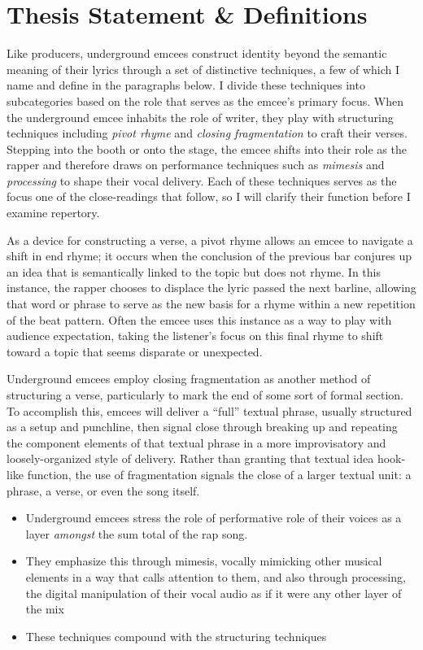 \onehalfspacing

\section{Thesis Statement \& Definitions}
Like producers, underground emcees construct identity beyond the semantic meaning of their lyrics
through a set of distinctive techniques, a few of which I name and define in the paragraphs below. 
I divide these techniques into subcategories based on the role that serves as the emcee's primary 
focus. When the underground emcee inhabits the role of writer, they play with structuring techniques 
including  \emph{pivot rhyme} and \emph{closing fragmentation} to craft their verses. Stepping into
the booth or onto the stage, the emcee shifts into their role as the rapper and therefore draws on
performance techniques such as \emph{mimesis} and \emph{processing} to shape their vocal delivery. 
Each of these techniques serves as the focus one of the close-readings that follow, so I will clarify
their function before I examine repertory.

As a device for constructing a verse, a pivot rhyme allows an emcee to navigate a shift in end rhyme;
it occurs when the conclusion of the previous bar conjures up an idea that is semantically linked to
the topic but does not rhyme. In this instance, the rapper chooses to displace the lyric passed the next
barline, allowing that word or phrase to serve as the new basis for a rhyme within a new repetition of
the beat pattern. Often the emcee uses this instance as a way to play with audience expectation, taking
the listener's focus on this final rhyme to shift toward a topic that seems disparate or unexpected.

Underground emcees employ closing fragmentation as another method of structuring a verse, particularly
to mark the end of some sort of formal section. To accomplish this, emcees will deliver a ``full'' textual
phrase, usually structured as a setup and punchline, then signal close through breaking up and repeating the
component elements of that textual phrase in a more improvisatory and loosely-organized style of delivery.
Rather than granting that textual idea hook-like function, the use of fragmentation signals the close of
a larger textual unit: a phrase, a verse, or even the song itself.

    \begin{itemize}
        \item Underground emcees stress the role of performative role of their voices as a layer
        \emph{amongst} the sum total of the rap song. 
        \item They emphasize this through mimesis, vocally mimicking other musical elements in a way
        that calls attention to them, and also through processing, the digital manipulation of their 
        vocal audio as if it were any other layer of the mix
        \item These techniques compound with the structuring techniques
    \end{itemize}


